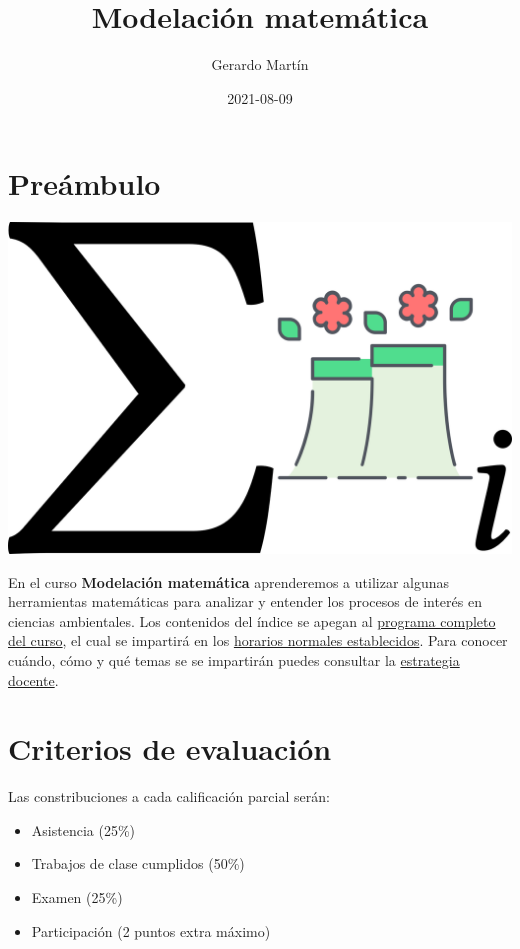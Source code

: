 \documentclass[
]{book}
\title{Modelación matemática}
\author{Gerardo Martín}
\date{2021-08-09}
\providecommand{\tightlist}{%
  \setlength{\itemsep}{0pt}\setlength{\parskip}{0pt}}
\begin{document}
\maketitle

{
\setcounter{tocdepth}{1}
\tableofcontents
}
\hypertarget{preuxe1mbulo}{%
\chapter{Preámbulo}\label{preuxe1mbulo}}

\begin{center}\includegraphics[width=20.83in]{logo} \end{center}

En el curso \textbf{Modelación matemática} aprenderemos a utilizar algunas herramientas matemáticas para analizar y entender los procesos de interés en ciencias ambientales. Los contenidos del índice se apegan al \href{Programa-curso.pdf}{programa completo del curso}, el cual se impartirá en los \href{Horario.pdf}{horarios normales establecidos}. Para conocer cuándo, cómo y qué temas se se impartirán puedes consultar la \href{Estrategia-docente.pdf}{estrategia docente}.

\hypertarget{criterios-de-evaluaciuxf3n}{%
\chapter{Criterios de evaluación}\label{criterios-de-evaluaciuxf3n}}

Las constribuciones a cada calificación parcial serán:

\begin{itemize}
\tightlist
\item
  Asistencia (25\%)
\item
  Trabajos de clase cumplidos (50\%)
\item
  Examen (25\%)
\item
  Participación (2 puntos extra máximo)
\end{itemize}
\end{document}
